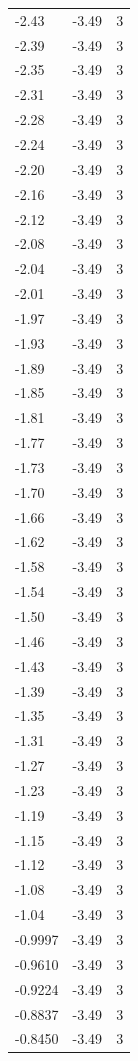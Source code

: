 \begin{longtable}{lrr}
  -2.43 & -3.49 & 3 \\
  -2.39 & -3.49 & 3 \\
  -2.35 & -3.49 & 3 \\
  -2.31 & -3.49 & 3 \\
  -2.28 & -3.49 & 3 \\
  -2.24 & -3.49 & 3 \\
  -2.20 & -3.49 & 3 \\
  -2.16 & -3.49 & 3 \\
  -2.12 & -3.49 & 3 \\
  -2.08 & -3.49 & 3 \\
  -2.04 & -3.49 & 3 \\
  -2.01 & -3.49 & 3 \\
  -1.97 & -3.49 & 3 \\
  -1.93 & -3.49 & 3 \\
  -1.89 & -3.49 & 3 \\
  -1.85 & -3.49 & 3 \\
  -1.81 & -3.49 & 3 \\
  -1.77 & -3.49 & 3 \\
  -1.73 & -3.49 & 3 \\
  -1.70 & -3.49 & 3 \\
  -1.66 & -3.49 & 3 \\
  -1.62 & -3.49 & 3 \\
  -1.58 & -3.49 & 3 \\
  -1.54 & -3.49 & 3 \\
  -1.50 & -3.49 & 3 \\
  -1.46 & -3.49 & 3 \\
  -1.43 & -3.49 & 3 \\
  -1.39 & -3.49 & 3 \\
  -1.35 & -3.49 & 3 \\
  -1.31 & -3.49 & 3 \\
  -1.27 & -3.49 & 3 \\
  -1.23 & -3.49 & 3 \\
  -1.19 & -3.49 & 3 \\
  -1.15 & -3.49 & 3 \\
  -1.12 & -3.49 & 3 \\
  -1.08 & -3.49 & 3 \\
  -1.04 & -3.49 & 3 \\
  -0.9997 & -3.49 & 3 \\
  -0.9610 & -3.49 & 3 \\
  -0.9224 & -3.49 & 3 \\
  -0.8837 & -3.49 & 3 \\
  -0.8450 & -3.49 & 3 \\

\end{longtable}
